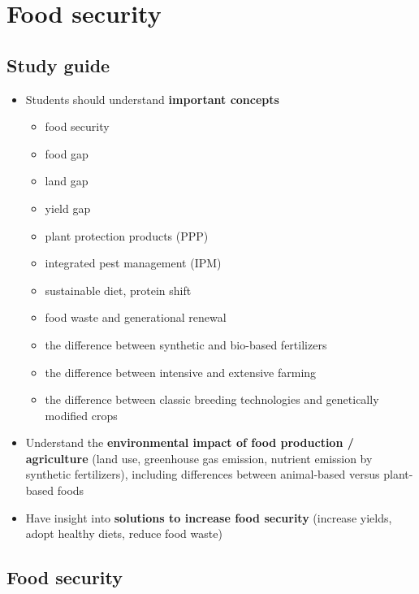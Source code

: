 \documentclass[../summary.tex]{subfiles}
\begin{document}
	
	\section{Food security}
	
	\subsection{Study guide}
	\begin{itemize}
		\setlength{\itemsep}{0pt}
		\item Students should understand \textbf{important concepts}
		\begin{itemize}
			\item food security
			\item food gap
			\item land gap
			\item yield gap
			\item plant protection products (PPP)
			\item integrated pest management (IPM)
			\item sustainable diet, protein shift
			\item food waste and generational renewal
			\item the difference between synthetic and bio-based fertilizers
			\item the difference between intensive and extensive farming
			\item the difference between classic breeding technologies and genetically modified crops
		\end{itemize}
		\item Understand the \textbf{environmental impact of food production / agriculture} (land use, greenhouse gas emission, nutrient emission by synthetic fertilizers), including differences between animal-based versus plant-based foods
		\item Have insight into \textbf{solutions to increase food security} (increase yields, adopt healthy diets, reduce food waste)
	\end{itemize}

	\subsection{Food security}
	
\end{document}
